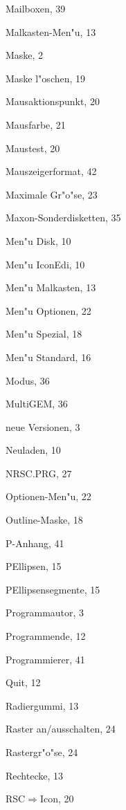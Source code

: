 \begin{theindex}
  \indexspace

  \item Mailboxen, 39
  \item Malkasten-Men"u, 13
  \item Maske, 2
  \item Maske l"oschen, 19
  \item Mausaktionspunkt, 20
  \item Mausfarbe, 21
  \item Maustest, 20
  \item Mauszeigerformat, 42
  \item Maximale Gr"o"se, 23
  \item Maxon-Sonderdisketten, 35
  \item Men"u Disk, 10
  \item Men"u IconEdi, 10
  \item Men"u Malkasten, 13
  \item Men"u Optionen, 22
  \item Men"u Spezial, 18
  \item Men"u Standard, 16
  \item Modus, 36
  \item MultiGEM, 36

  \indexspace

  \item neue Versionen, 3
  \item Neuladen, 10
  \item NRSC.PRG, 27

  \indexspace

  \item Optionen-Men"u, 22
  \item Outline-Maske, 18

  \indexspace

  \item P-Anhang, 41
  \item PEllipsen, 15
  \item PEllipsensegmente, 15
  \item Programmautor, 3
  \item Programmende, 12
  \item Programmierer, 41

  \indexspace

  \item Quit, 12

  \indexspace

  \item Radiergummi, 13
  \item Raster an/ausschalten, 24
  \item Rastergr"o"se, 24
  \item Rechtecke, 13
  \item RSC${\Rightarrow}$Icon, 20


\end{theindex}
